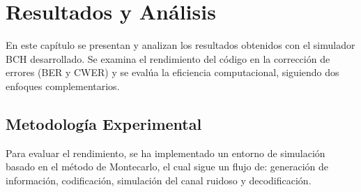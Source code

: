 \chapter{Resultados y Análisis}
\label{cap:resultados}

En este capítulo se presentan y analizan los resultados obtenidos con el simulador BCH desarrollado. Se examina el rendimiento del código en la corrección de errores (BER y CWER) y se evalúa la eficiencia computacional, siguiendo dos enfoques complementarios.

\section{Metodología Experimental}

Para evaluar el rendimiento, se ha implementado un entorno de simulación basado en el método de Montecarlo, el cual sigue un flujo de: generación de información, codificación, simulación del canal ruidoso y decodificación.

